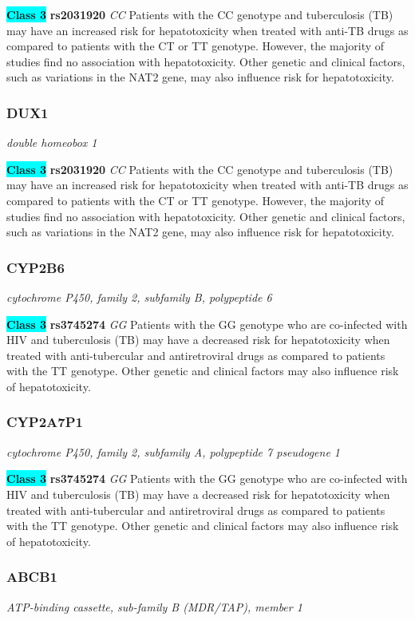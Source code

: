\documentclass{report}
\begin{document}
\textbf{\colorbox{cyan} {Class 3}} \textbf{ rs2031920 } \textit{ CC }
Patients with the CC genotype and tuberculosis (TB) may have an increased risk for hepatotoxicity when treated with anti-TB drugs as compared to patients with the CT or TT genotype. However, the majority of studies find no association with hepatotoxicity. Other genetic and clinical factors, such as variations in the NAT2 gene, may also influence risk for hepatotoxicity.\newline\subsubsection{ DUX1 }
\textit{ double homeobox 1 }

\textbf{\colorbox{cyan} {Class 3}} \textbf{ rs2031920 } \textit{ CC }
Patients with the CC genotype and tuberculosis (TB) may have an increased risk for hepatotoxicity when treated with anti-TB drugs as compared to patients with the CT or TT genotype. However, the majority of studies find no association with hepatotoxicity. Other genetic and clinical factors, such as variations in the NAT2 gene, may also influence risk for hepatotoxicity.\newline\subsubsection{ CYP2B6 }
\textit{ cytochrome P450, family 2, subfamily B, polypeptide 6 }

\textbf{\colorbox{cyan} {Class 3}} \textbf{ rs3745274 } \textit{ GG }
Patients with the GG genotype who are co-infected with HIV and tuberculosis (TB) may have a decreased risk for hepatotoxicity when treated with anti-tubercular and antiretroviral drugs as compared to patients with the TT genotype. Other genetic and clinical factors may also influence risk of hepatotoxicity.\newline\subsubsection{ CYP2A7P1 }
\textit{ cytochrome P450, family 2, subfamily A, polypeptide 7 pseudogene 1 }

\textbf{\colorbox{cyan} {Class 3}} \textbf{ rs3745274 } \textit{ GG }
Patients with the GG genotype who are co-infected with HIV and tuberculosis (TB) may have a decreased risk for hepatotoxicity when treated with anti-tubercular and antiretroviral drugs as compared to patients with the TT genotype. Other genetic and clinical factors may also influence risk of hepatotoxicity.\newline\subsubsection{ ABCB1 }
\textit{ ATP-binding cassette, sub-family B (MDR/TAP), member 1 }
\end{document}
